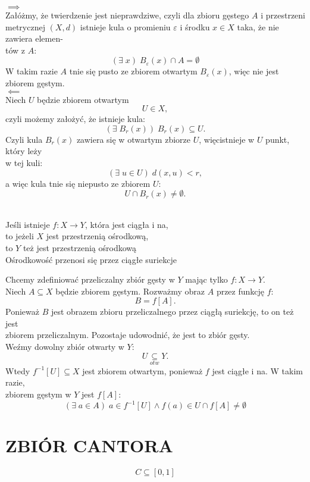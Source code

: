 \documentclass{article}
\begin{document}
\dowod
$\implies$\medskip\\
Załóżmy, że twierdzenie jest nieprawdziwe, czyli dla zbioru gęstego $A$ i przestrzeni \\metrycznej $(X, d)$ istnieje kula o promieniu $\varepsilon$ i środku $x\in X$ taka, że nie zawiera elemen-\\tów z $A$:
$$(\exists\;x)\;B_\varepsilon(x)\cap A=\emptyset$$
W takim razie $A$ tnie się pusto ze zbiorem otwartym $B_\varepsilon(x)$, więc nie jest zbiorem gęstym.\bigskip\\
$\impliedby$\medskip\\
Niech $U$ będzie zbiorem otwartym
$$U\in X,$$
czyli możemy założyć, że istnieje kula:
$$(\exists\;B_r(x))\;B_r(x)\subseteq U.$$
Czyli kula $B_r(x)$ zawiera się w otwartym zbiorze $U$, więcistnieje w $U$ punkt, który leży \\w tej kuli:
$$(\exists\;u\in U)\;d(x,u)<r,$$
a więc kula tnie się niepusto ze zbiorem $U$:
$$U\cap B_r(x)\neq\emptyset.$$
\kondow
{}\bigskip\\
\begin{center}\large
    Jeśli istnieje $f:X\to Y$, która jest ciągła i na, \\to jeżeli $X$ jest przestrzenią ośrodkową, \\to $Y$ też jest przestrzenią ośrodkową\medskip\\
    Ośrodkowość {\color{def}przenosi się przez ciągłe suriekcje}
\end{center}\bigskip
\dowod
Chcemy zdefiniować przeliczalny zbiór gęsty w $Y$ mając tylko $f:X\to Y$.\medskip\\
Niech $A\subseteq X$ będzie zbiorem gęstym. Rozważmy obraz $A$ przez funkcję $f$:
$$B=f[A].$$
Ponieważ $B$ jest obrazem zbioru przeliczalnego przez ciągłą suriekcję, to on też jest \\zbiorem przeliczalnym. Pozostaje udowodnić, że jest to zbiór gęsty.\medskip\\
Weźmy dowolny zbiór otwarty w $Y$:
$$U\underset{otw}\subseteq Y.$$
Wtedy $f^{-1}[U]\subseteq X$ jest zbiorem otwartym, ponieważ $f$ jest ciągłe i na. W takim razie, \\zbiorem gęstym w $Y$ jest $f[A]$:
$$(\exists\;a\in A)\;a\in f^{-1}[U]\land f(a)\in U\cap f[A]\neq \emptyset$$
\kondow 
\section{ZBIÓR CANTORA}
$$C\subseteq [0,1]$$
\end{document}
